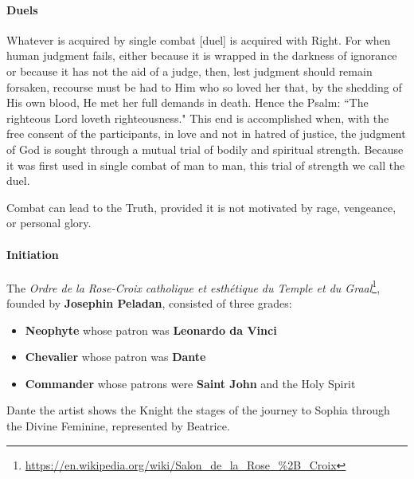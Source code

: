 \paragraph{Duels}
\begin{quotex}
Whatever is acquired by single combat [duel] is acquired with Right. For when human judgment fails, either because it is wrapped in the darkness of ignorance or because it has not the aid of a judge, then, lest judgment should remain forsaken, recourse must be had to Him who so loved her that, by the shedding of His own blood, He met her full demands in death. Hence the Psalm: ``The righteous Lord loveth righteousness." This end is accomplished when, with the free consent of the participants, in love and not in hatred of justice, the judgment of God is sought through a mutual trial of bodily and spiritual strength. Because it was first used in single combat of man to man, this trial of strength we call the duel. 

\end{quotex}
Combat can lead to the Truth, provided it is not motivated by rage, vengeance, or personal glory.

\paragraph{Initiation}
The \emph{Ordre de la Rose-Croix catholique et esthétique du Temple et du Graal}\footnote{\url{https://en.wikipedia.org/wiki/Salon_de_la_Rose_\%2B_Croix}}, founded by \textbf{Josephin Peladan}, consisted of three grades:

\begin{itemize}
\item \textbf{Neophyte} whose patron was \textbf{Leonardo da Vinci} 
\item \textbf{Chevalier} whose patron was \textbf{Dante} 
\item \textbf{Commander} whose patrons were \textbf{Saint John} and the Holy Spirit 
\end{itemize}
Dante the artist shows the Knight the stages of the journey to Sophia through the Divine Feminine, represented by Beatrice.

